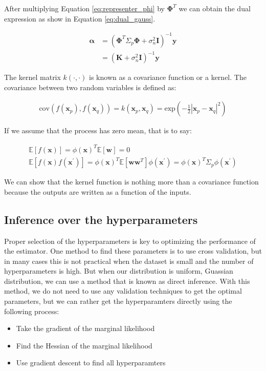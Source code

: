 \documentclass[11pt, twoside]{article}   	%
\begin{document}
After multiplying Equation \ref{eq:representer_phi} by $\mathbf{\Phi}^T$ we can obtain the dual 
expression as show in Equation \ref{eq:dual_gauss}.

\begin{align}
\mathbf{\alpha} &= (\mathbf{\Phi}^T \Sigma_p \mathbf{\Phi} + \sigma^2_n \mathbf{I})^{-1} \mathbf{y}\\
&= (\mathbf{K} + \sigma^2_n \mathbf{I})^{-1} \mathbf{y} \label{eq:dual_gauss}
\end{align}

The kernel matrix $k(\cdot, \cdot)$ is known as a covariance function or a kernel. 
The covariance between two random variables is defined as: 

\begin{align}
\text{cov}(f(\mathbf{x}_p), f(\mathbf{x}_q)) = k(\mathbf{x}_p, \mathbf{x}_q) = \text{exp}(-\frac{1}{2}|\mathbf{x}_p - 
\mathbf{x}_q|^2)
\end{align}

If we assume that the process has zero mean, that is to say:

\begin{align}
\mathds{E}[f(\mathbf{x})] = \phi(\mathbf{x})^T \mathds{E}[\mathbf{w}] = 0 \\
\mathds{E}[f(\mathbf{x}) f(\mathbf{x}^{'})] = \phi(\mathbf{x})^T\mathds{E}[\mathbf{ww}^T]\phi(\mathbf{x}^{'}) 
= \phi(\mathbf{x})^T\Sigma_p\phi(\mathbf{x}^{'})
\end{align}

We can show that the kernel function is nothing more than a covariance function because the outputs
are written as a function of the inputs. 


\subsection{Inference over the hyperparameters}
Proper selection of the hyperparameters is key to optimizing the performance of the estimator. One
method to find these parameters is to use cross validation, but in many cases this is not practical when
the dataset is small and the number of hyperparameters is high. But when 
our distribution is uniform, Guassian distribution, we can use a method that is
known as direct inference. With this method, we do not need to use any 
validation techniques to get the optimal parameters, but we can rather get
the hyperparamters directly using the following process: 

\begin{itemize}
  \item Take the gradient of the marginal likelihood
  \item Find the Hessian of the marginal likelihood
  \item Use gradient descent to find all hyperparamters
\end{itemize}
\end{document}
